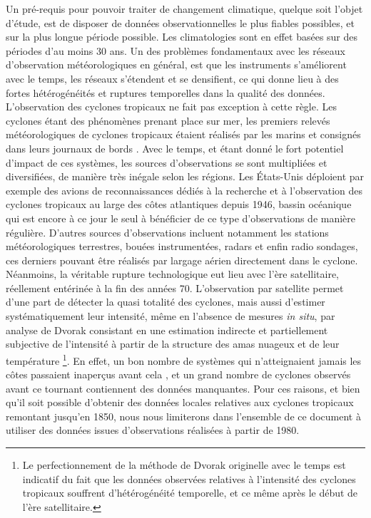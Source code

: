 \documentclass[../main.tex]{subfiles}
\begin{document}
Un pré-requis pour pouvoir traiter de changement climatique, quelque soit l'objet d'étude, est de disposer de données observationnelles le plus fiables possibles, et sur la plus longue période possible. Les climatologies sont en effet basées sur des périodes d'au moins \num{30} ans. Un des problèmes fondamentaux avec les réseaux d'observation météorologiques en général, est que les instruments s'améliorent avec le temps, les réseaux s'étendent et se densifient, ce qui donne lieu à
des fortes hétérogénéités et ruptures temporelles dans la qualité des données. L'observation des cyclones tropicaux ne fait pas exception à cette règle. Les cyclones étant des phénomènes prenant place sur mer, les premiers relevés météorologiques de cyclones tropicaux étaient réalisés par les marins et consignés dans leurs journaux de bords \parencite{knapp_international_2010}. Avec le temps, et étant donné le fort potentiel d'impact de ces systèmes, les sources d'observations se sont
multipliées et diversifiées, de manière très inégale selon les régions. Les États-Unis déploient par exemple des avions de reconnaissances dédiés à la recherche et à l'observation des cyclones tropicaux au large des côtes atlantiques depuis \num{1946}, bassin océanique qui est encore à ce jour le seul à bénéficier de ce type d'observations de manière régulière. D'autres sources d'observations incluent notamment les stations météorologiques terrestres, bouées instrumentées, radars et
enfin radio
sondages, ces derniers pouvant être réalisés par largage aérien directement dans le cyclone. Néanmoins, la véritable rupture technologique eut lieu avec l'ère satellitaire, réellement entérinée à la fin des années 70. L'observation par satellite permet d'une part de détecter la quasi totalité des cyclones, mais aussi d'estimer systématiquement leur intensité, même en l'absence de mesures \textit{in situ}, par analyse de Dvorak consistant en
une estimation indirecte et partiellement subjective de l'intensité à partir de la structure des amas nuageux et de leur température \parencite{dvorak_tropical_1975,velden_development_1998,olander_development_2002,olander_advanced_2007,olander_advanced_2019}\footnote{Le perfectionnement de la méthode de Dvorak originelle avec le temps est indicatif du fait que les données observées relatives à l'intensité des cyclones tropicaux souffrent d'hétérogénéité temporelle, et ce même après le début de l'ère
satellitaire.}. En effet, un bon nombre de systèmes qui n'atteignaient jamais les côtes
passaient inaperçus avant cela \parencite{landsea_atlantic_2004}, et un grand nombre de cyclones observés avant ce tournant contiennent des données manquantes. Pour ces raisons,
et bien qu'il soit possible d'obtenir des données locales relatives aux cyclones tropicaux remontant jusqu'en \num{1850}, nous nous limiterons dans l'ensemble de ce document à utiliser des données issues d'observations réalisées à partir de \num{1980}.
\end{document}
